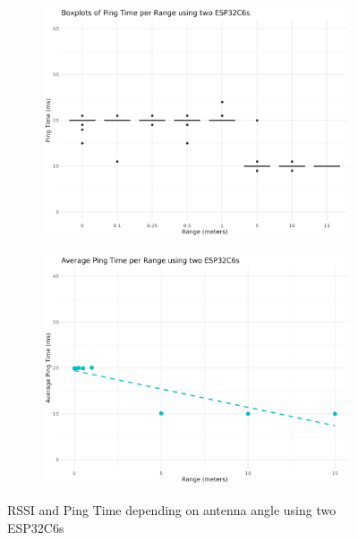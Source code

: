 \begin{figure}[H]
    \begin{subfigure}{0.45\textwidth}
        \includegraphics[width=\linewidth]{rstudio/analysis/plots/ESP32C6_ping_box.png}
    \end{subfigure}
    \begin{subfigure}{0.45\textwidth}
        \includegraphics[width=\linewidth]{rstudio/analysis/plots/ESP32C6_avg_ping.png}
    \end{subfigure}
    \vspace{\ftspace}
    \caption{RSSI and Ping Time depending on antenna angle using two ESP32C6s}
    \label{fig:rssipingrange_esp32c6}
\end{figure}

